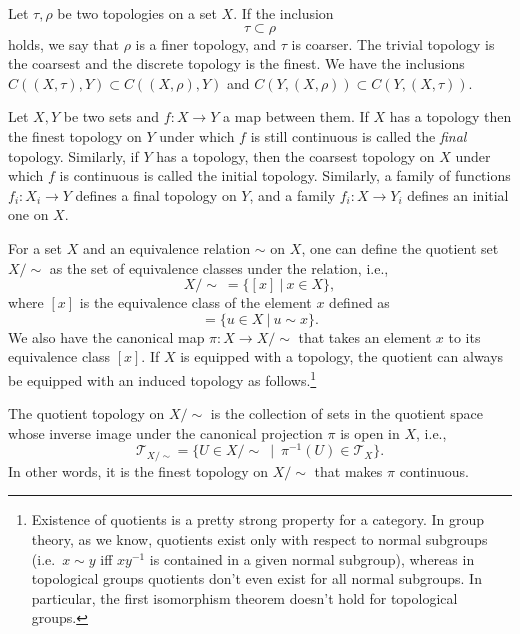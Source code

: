 \begin{defn}
    Let $\tau,\rho$ be two topologies on a set $X$. If the inclusion
    \[\tau \subset \rho\]
    holds, we say that $\rho$ is a finer topology, and $\tau$ is coarser. The trivial topology is the coarsest and the discrete topology is the finest. We have the inclusions $C((X,\tau),Y)\subset C((X,\rho),Y)$ and $C(Y,(X,\rho))\subset C(Y,(X,\tau))$.
\end{defn}

\begin{defn}
    Let $X,Y$ be two sets and $f:X\to Y$ a map between them. If $X$ has a topology then the finest topology on $Y$ under which $f$ is still continuous is called the \emph{final} topology. Similarly, if $Y$ has a topology, then the coarsest topology on $X$ under which $f$ is continuous is called the initial topology. Similarly, a family of functions $f_i:X_i\to Y$ defines a final topology on $Y$, and a family $f_i:X\to Y_i$ defines an initial one on $X$.
\end{defn}

For a set $X$ and an equivalence relation $\sim$ on $X$, one can define the quotient set $X/\sim$ as the set of equivalence classes under the relation, i.e.,
\begin{equation}
    X/\sim ~ = \{ [x] ~|~ x\in X \},
\end{equation}
where $[x]$ is the equivalence class of the element $x$ defined as
\begin{equation}
    [x] = \{u\in X ~|~ u \sim x\}.
\end{equation}
We also have the canonical map $\pi:X\rightarrow X/\sim$ that takes an element $x$ to its equivalence class $[x]$. If $X$ is equipped with a topology, the quotient can always be equipped with an induced topology as follows.\footnote{Existence of quotients is a pretty strong property for a category. In group theory, as we know, quotients exist only with respect to normal subgroups (i.e.\ $x\sim y$ iff $xy^{-1}$ is contained in a given normal subgroup), whereas in topological groups quotients don't even exist for all normal subgroups. In particular, the first isomorphism theorem doesn't hold for topological groups.}


\begin{defn}
The quotient topology on $X/\sim$ is the collection of sets  in the quotient space whose inverse image under the canonical projection $\pi$ is open in $X$, i.e.,
\begin{equation}
    \mathcal{T}_{X/\sim} = \{U\in X/\sim ~ \mid ~ \pi^{-1}(U) \in \mathcal{T}_X\}.
\end{equation}
In other words, it is the finest topology on $X/\sim$ that makes $\pi$ continuous.
\end{defn}

